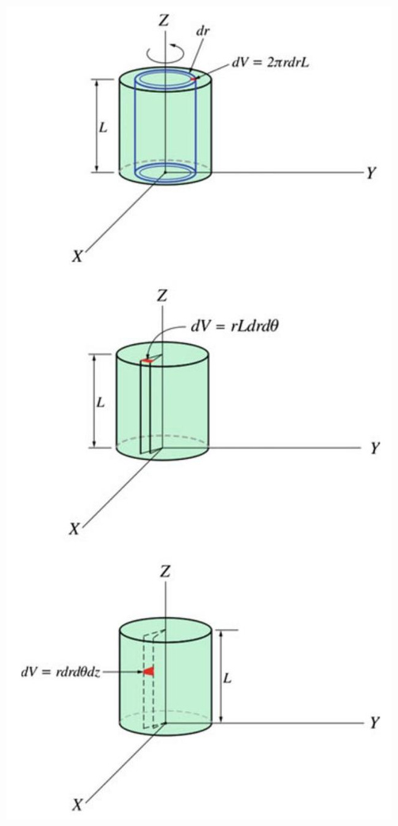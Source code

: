 \documentclass[10pt]{article}
\begin{document}
\begin{center}
\includegraphics[max width=\textwidth]{2024_09_13_db1f357d2aad0a03eb2eg-121(1)}
\end{center}
\end{document}
